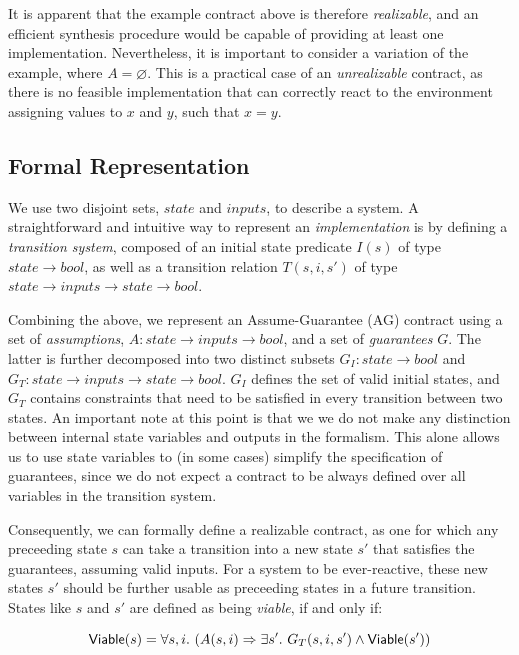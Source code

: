 It is apparent that the example contract above is therefore \emph{realizable},
and an efficient synthesis procedure would be capable of providing at least one
implementation. Nevertheless, it is important to consider a variation of the
example, where $A = \varnothing$. This is a practical case of an
\emph{unrealizable} contract, as there is no feasible implementation that can
correctly react to the environment assigning values to $x$ and $y$, such that
$x = y$.

\subsection{Formal Representation}
\label{sec:formals}
We use two disjoint sets, $state$ and $inputs$, to describe a system.
A straightforward and intuitive way to represent an \emph{implementation} is by
defining a \emph{transition system}, composed of an initial state
predicate $I(s)$ of type $state \to bool$, as well as a transition relation
$T(s,i,s')$ of type $state \to inputs \to state \to bool$.

Combining the above, we represent an Assume-Guarantee (AG) contract using a set
of \emph{assumptions}, $A: state \rightarrow inputs \rightarrow bool$,
and a set of \emph{guarantees} $G$. The latter is further decomposed into two
distinct subsets $G_I: state \rightarrow bool$ and $G_T: state \rightarrow
inputs \rightarrow state \rightarrow bool$. $G_I$ defines the set of valid
initial states, and $G_T$ contains constraints that need to be satisfied in
every transition between two states. An important note at this point is that we
we do not make any distinction between internal state variables and outputs in the
formalism. This alone allows us to use state variables to (in some cases)
simplify the specification of guarantees, since we do not expect a contract
to be always defined over all variables in the transition system.

Consequently, we can formally define a realizable contract, as one for which any
preceeding state $s$ can take a transition into a new state $s'$ that satisfies
the guarantees, assuming valid inputs. For a system to be ever-reactive, these
new states $s'$ should be further usable as preceeding states in a future
transition. States like $s$ and $s'$ are defined as being \textit{viable}, if
and only if:

\begin{equation}
{\mathsf {Viable}}(s) = \forall s,i. \ (A(s, i) \Rightarrow \exists s'.~ G_T(s, i,s')
\land {\mathsf {Viable}}(s'))
\label{eq:viable}
\end{equation}

